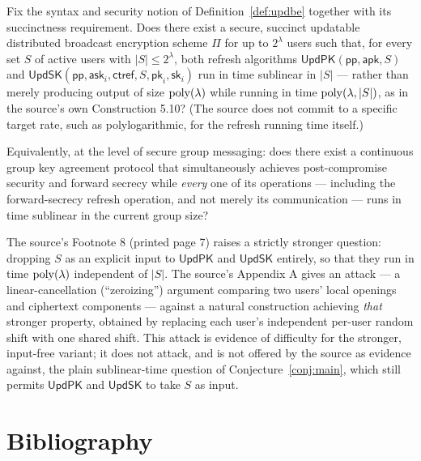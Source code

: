 \documentclass{aicr-conjecture}
\newcommand{\lam}{\lambda}
\newcommand{\UpdPK}{\mathsf{UpdPK}}
\newcommand{\UpdSK}{\mathsf{UpdSK}}
\newcommand{\apk}{\mathsf{apk}}
\newcommand{\ask}{\mathsf{ask}}
\newcommand{\pk}{\mathsf{pk}}
\newcommand{\sk}{\mathsf{sk}}
\newcommand{\ctref}{\mathsf{ctref}}
\begin{document}
\begin{conjecture}\label{conj:main}
Fix the syntax and security notion of Definition~\ref{def:updbe}
together with its succinctness requirement. Does there exist a secure,
succinct updatable distributed broadcast encryption scheme $\Pi$ for up
to $2^{\lam}$ users such that, for every set $S$ of active users with
$|S| \le 2^{\lam}$, both refresh algorithms $\UpdPK(\mathsf{pp}, \apk,
S)$ and $\UpdSK(\mathsf{pp}, \ask_{i}, \ctref, S, \pk_{i}, \sk_{i})$ run
in time sublinear in $|S|$ --- rather than merely producing output of
size $\poly(\lam)$ while running in time $\poly(\lam, |S|)$, as in the
source's own Construction 5.10? (The source does not commit to a
specific target rate, such as polylogarithmic, for the refresh running
time itself.)

Equivalently, at the level of secure group messaging: does there exist
a continuous group key agreement protocol that simultaneously achieves
post-compromise security and forward secrecy while \emph{every} one of
its operations --- including the forward-secrecy refresh operation, and
not merely its communication --- runs in time sublinear in the current
group size?
\end{conjecture}

\begin{remark}
The source's Footnote 8 (printed page 7) raises a strictly stronger
question: dropping $S$ as an explicit input to $\UpdPK$ and $\UpdSK$
entirely, so that they run in time $\poly(\lam)$ independent of $|S|$.
The source's Appendix A gives an attack --- a linear-cancellation
(``zeroizing'') argument comparing two users' local openings and
ciphertext components --- against a natural construction achieving
\emph{that} stronger property, obtained by replacing each user's
independent per-user random shift with one shared shift. This attack is
evidence of difficulty for the stronger, input-free variant; it does
not attack, and is not offered by the source as evidence against, the
plain sublinear-time question of Conjecture~\ref{conj:main}, which
still permits $\UpdPK$ and $\UpdSK$ to take $S$ as input.
\end{remark}

\section{Bibliography}
\end{document}
